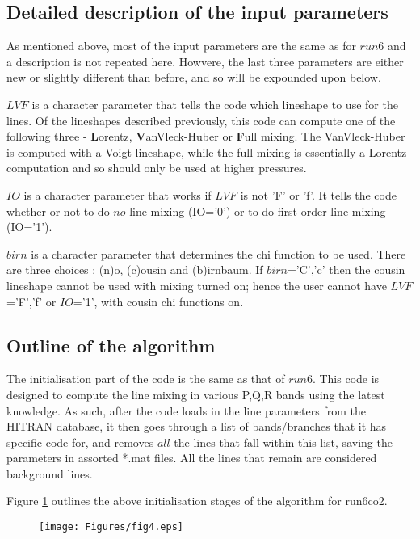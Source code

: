 \documentclass[11pt]{article}
\begin{document}
\subsection{Detailed description of the input parameters}

As mentioned above, most of the input parameters are the same as for $run6$
and a description is not repeated here. Howvere, the last three parameters
are either new or slightly different than before, and so will be expounded
upon below.

$LVF$ is a character parameter that tells the code which lineshape to use 
for the lines. Of the lineshapes described previously, this code can 
compute one of the following three - \textbf{L}orentz, 
\textbf{V}anVleck-Huber or 
\textbf{F}ull mixing. The VanVleck-Huber is computed with a Voigt 
lineshape, while the full mixing is essentially a Lorentz computation and so
should only be used at higher pressures.

$IO$ is a character parameter that works if $LVF$ is not 'F' or 'f'. It 
tells the code whether or not to do $no$ line mixing (IO='0') or to do 
first order line mixing (IO='1').

$birn$ is a character parameter that determines the chi function to be used.
There are three choices : (n)o, (c)ousin and (b)irnbaum. If $birn$='C','c'
then the cousin lineshape cannot be used with mixing turned on; hence the 
user cannot have $LVF$='F','f' or $IO$='1', with cousin chi functions on.

\subsection{Outline of the algorithm}
The initialisation part of the code is the same as that of $run6$. This code
is designed to compute the line mixing in various P,Q,R bands using the 
latest
knowledge. As such, after the code loads in the line parameters from the 
HITRAN database, it then goes through a list of bands/branches that it has
specific code for, and removes $all$ the lines that fall within this list,
saving the parameters in assorted *.mat files. All the lines that remain are
considered background lines.

Figure \ref{fig:init_algCO2} outlines the above initialisation stages of 
the algorithm for run6co2.

\begin{figure}[h]
  \begin{center}\texttt{[image: Figures/fig4.eps]}\end{center}
  \caption[Outline of initialization algorithm for CO2]{}
  \label{fig:init_algCO2}
\end{figure}
\end{document}
